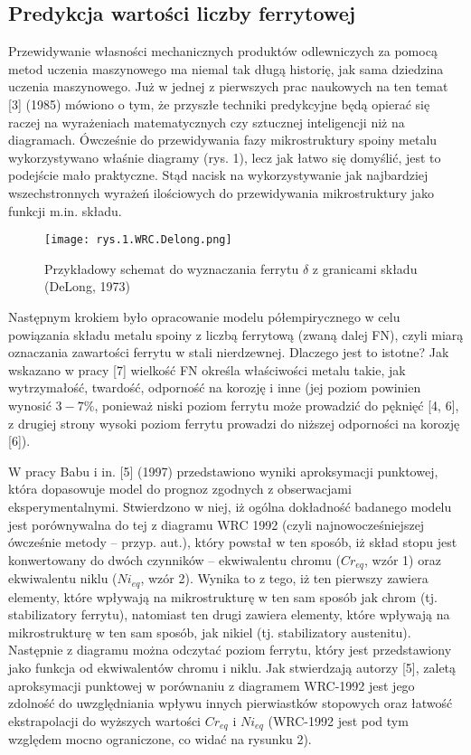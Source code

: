 \subsection{Predykcja wartości liczby ferrytowej}

Przewidywanie własności mechanicznych produktów odlewniczych za pomocą metod uczenia maszynowego ma niemal tak długą historię, jak sama dziedzina uczenia maszynowego. Już w jednej z pierwszych prac naukowych na ten temat [3] (1985) mówiono o tym, że przyszłe techniki predykcyjne będą opierać się raczej na wyrażeniach matematycznych czy sztucznej inteligencji niż na diagramach. 
Ówcześnie do przewidywania fazy mikrostruktury spoiny metalu wykorzystywano właśnie diagramy (rys. 1), lecz jak łatwo się domyślić, jest to podejście mało praktyczne. Stąd nacisk na wykorzystywanie jak najbardziej wszechstronnych wyrażeń ilościowych do przewidywania mikrostruktury jako funkcji m.in. składu.

\begin{figure}[h]
    \centering
    \texttt{[image: rys.1.WRC.Delong.png]}
    \caption{Przykładowy schemat do wyznaczania ferrytu $ \delta $ z granicami składu (DeLong, 1973)}
    \label{fig:mesh1}
\end{figure}

Następnym krokiem było opracowanie modelu półempirycznego w celu powiązania składu metalu spoiny z liczbą ferrytową (zwaną dalej FN), czyli miarą oznaczania zawartości ferrytu w stali nierdzewnej. Dlaczego jest to istotne? Jak wskazano w pracy [7] wielkość FN określa właściwości metalu takie, jak wytrzymałość, twardość, odporność na korozję i inne (jej poziom powinien wynosić $3-7\%$, ponieważ niski poziom ferrytu może prowadzić do pęknięć [4, 6], z drugiej strony wysoki poziom ferrytu prowadzi do niższej odporności na korozję [6]). 

W pracy Babu i in. [5] (1997) przedstawiono wyniki aproksymacji punktowej, która dopasowuje model do prognoz zgodnych z obserwacjami eksperymentalnymi. Stwierdzono w niej, iż ogólna dokładność badanego modelu jest porównywalna do tej z diagramu WRC 1992 (czyli najnowocześniejszej ówcześnie metody – przyp. aut.), który powstał w ten sposób, iż skład stopu jest konwertowany do dwóch czynników – ekwiwalentu chromu ($Cr_{eq}$, wzór 1) oraz ekwiwalentu niklu ($Ni_{eq}$, wzór 2). Wynika to z tego, iż ten pierwszy zawiera elementy, które wpływają na mikrostrukturę w ten sam sposób jak chrom (tj. stabilizatory ferrytu), natomiast ten drugi zawiera elementy, które wpływają na mikrostrukturę w ten sam sposób, jak nikiel (tj. stabilizatory austenitu). Następnie z diagramu można odczytać poziom ferrytu, który jest przedstawiony jako funkcja od ekwiwalentów chromu i niklu. Jak stwierdzają autorzy [5], zaletą aproksymacji punktowej w porównaniu z diagramem WRC-1992 jest jego zdolność do uwzględniania wpływu innych pierwiastków stopowych oraz łatwość ekstrapolacji do wyższych wartości $Cr_{eq}$ i $Ni_{eq}$ (WRC-1992 jest pod tym względem mocno ograniczone, co widać na rysunku 2).


